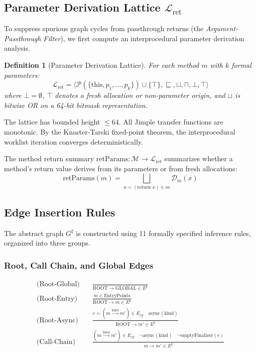 \documentclass[12pt,a4paper]{article}
\newtheorem{definition}[theorem]{Definition}
\newcommand{\GLOBAL}{\text{GLOBAL}}
\newcommand{\ROOT}{\text{ROOT}}
\newcommand{\retParams}{\text{retParams}}
\begin{document}
\subsection{Parameter Derivation Lattice $\mathcal{L}_{\text{ret}}$}

To suppress spurious graph cycles from passthrough returns (the \emph{Argument-Passthrough Filter}), we first compute an interprocedural parameter derivation analysis.

\begin{definition}[Parameter Derivation Lattice]
For each method $m$ with $k$ formal parameters:
\[
\mathcal{L}_{\text{ret}} = \langle \mathcal{P}(\{\text{this}, p_1, \ldots, p_k\}) \cup \{\top\}, \sqsubseteq, \sqcup, \sqcap, \bot, \top \rangle
\]
where $\bot = \emptyset$, $\top$ denotes a fresh allocation or non-parameter origin, and $\sqcup$ is bitwise OR on a 64-bit bitmask representation.
\end{definition}

The lattice has bounded height $\le 64$. All Jimple transfer functions are monotonic. By the Knaster-Tarski fixed-point theorem, the interprocedural worklist iteration converges deterministically.

The method return summary $\retParams : \mathcal{M} \to \mathcal{L}_{\text{ret}}$ summarizes whether a method's return value derives from its parameters or from fresh allocations:
\[
\retParams(m) = \bigsqcup_{u = (\text{return } x) \in m} \mathcal{D}_m(x)
\]

\subsection{Edge Insertion Rules}
\label{sec:edge-rules}

The abstract graph $G^\sharp$ is constructed using 11 formally specified inference rules, organized into three groups.

\subsubsection{Root, Call Chain, and Global Edges}

\begin{align}
\text{(Root-Global)} \quad & \frac{}{\ROOT \to \GLOBAL \in E^\sharp} \\[1ex]
\text{(Root-Entry)} \quad & \frac{m \in \text{EntryPoints}}{\ROOT \to m \in E^\sharp} \\[1ex]
\text{(Root-Async)} \quad & \frac{e = (m \xrightarrow{\text{kind}} m') \in E_{cg} \quad \text{async}(\text{kind})}{\ROOT \to m' \in E^\sharp} \\[1ex]
\text{(Call-Chain)} \quad & \frac{(m \xrightarrow{\text{kind}} m') \in E_{cg} \quad \neg\text{async}(\text{kind}) \quad \neg\text{emptyFinalizer}(e)}{m \to m' \in E^\sharp}
\end{align}
\end{document}

